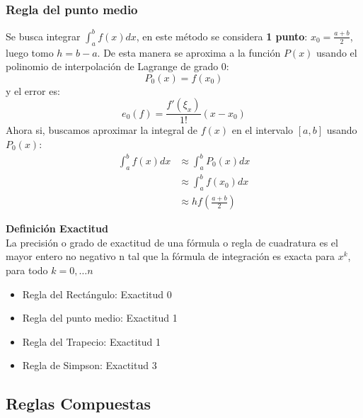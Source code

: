 \documentclass{article}
\newenvironment{definition}[2][Definición]
    { \begin{mdframed}[backgroundcolor=blue!10] \textbf{#1 #2} \\}
    {  \end{mdframed}}
\begin{document}
\subsubsection{Regla del punto medio}
Se busca integrar $\int_{a}^{b} f(x) dx$, en este método se considera \textbf{1 punto}: $x_0=\frac{a+b}{2}$, luego tomo $h=b-a$. De esta manera se aproxima a la función $P(x)$ usando el polinomio de interpolación de Lagrange de grado 0:
\begin{equation}
    P_0(x) = f(x_0)
\end{equation}
y el error es:
\begin{equation}
    e_0(f) = \frac{f'(\xi_x)}{1!} (x-x_0)
\end{equation}
Ahora si, buscamos aproximar la integral de $f(x)$ en el intervalo $[a,b]$ usando $P_0(x)$:
\begin{align}
    \int_{a}^{b} f(x) dx &\approx \int_{a}^{b} P_0(x) dx \\
    &\approx \int_{a}^{b} f(x_0) dx \\
    &\approx h f\left( \frac{a+b}{2} \right)
\end{align}

\begin{definition}{Exactitud}
    La precisión o grado de exactitud de una fórmula o regla de cuadratura es el mayor entero no negativo n tal que la fórmula de integración es exacta para $x^k$, para todo $k = 0,\dots n$
    \begin{itemize}
        \item Regla del Rectángulo: Exactitud 0
        \item Regla del punto medio: Exactitud 1
        \item Regla del Trapecio: Exactitud 1
        \item Regla de Simpson: Exactitud 3
    \end{itemize}
\end{definition}

\subsection{Reglas Compuestas}
\end{document}
